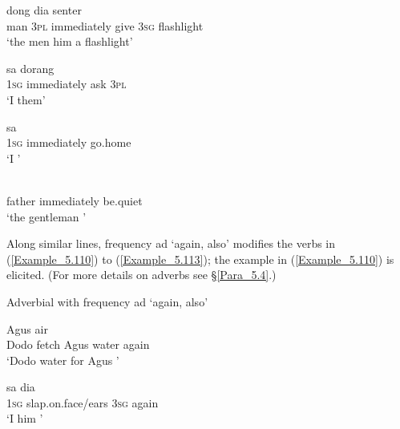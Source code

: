 \ea
\label{Example_5.106}
 {dong} {} {} {dia} {senter}\\ %
 man  \textsc{3pl}  immediately  give  \textsc{3sg}  flashlight\\
\glt 
‘the men  him a flashlight’ \textstyleExampleSource{[Elicited BR130221.013]}
\z

\ea
\label{Example_5.107}
\gll  sa      dorang\\
 \textsc{1sg}  immediately  ask  \textsc{3pl}\\
\glt 
`I  them’ \textstyleExampleSource{[080919-007-CvNP.0045]}
\z

\ea
\label{Example_5.108}\gll  sa    \\
 \textsc{1sg}  immediately  go.home\\
\glt 
‘I ’ \textstyleExampleSource{[081014-008-CvNP.0018]}
\z

\ea
\label{Example_5.109}
 {} {}\\ %
 father  immediately  be.quiet\\
\glt 
‘the gentleman ’ \textstyleExampleSource{[080917-010-CvEx.0213]}
\z


Along similar lines, frequency ad  ‘again, also’ modifies the verbs in (\ref{Example_5.110}) to (\ref{Example_5.113}); the example in (\ref{Example_5.110}) is elicited. (For more details on adverbs see §\ref{Para_5.4}.)


\begin{styleExampleTitle}
Adverbial  with frequency ad  ‘again, also’
\end{styleExampleTitle}

\ea
\label{Example_5.110}
 {} {Agus} {air} {}\\ %
 Dodo  fetch  Agus  water  again\\
\glt 
‘Dodo  water for Agus ’ \textstyleExampleSource{[Elicited BR130409.001]}
\z

\ea
\label{Example_5.111}
\gll  sa    dia  \\
 \textsc{1sg}  slap.on.face/ears  \textsc{3sg}  again\\
\glt 
‘I  him ’ \textstyleExampleSource{[081013-002-Cv.0007]}
\z

